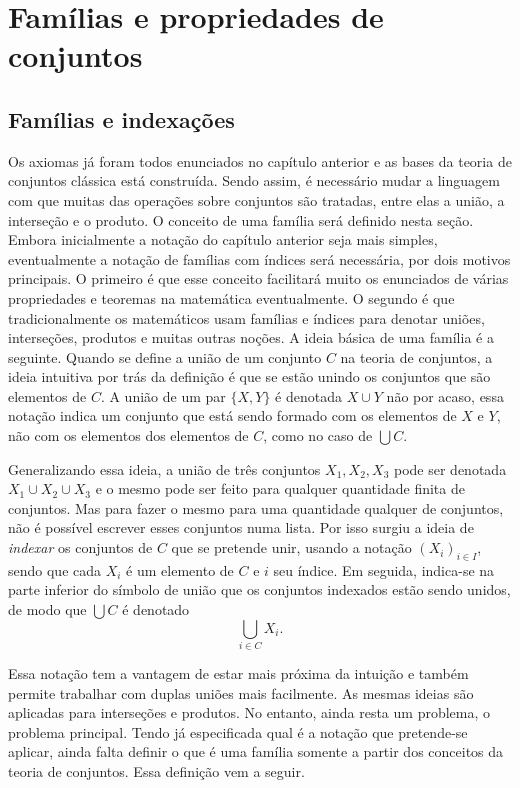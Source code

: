 \chapter{Famílias e propriedades de conjuntos}

\section{Famílias e indexações}

Os axiomas já foram todos enunciados no capítulo anterior e as bases da teoria de conjuntos clássica está construída. Sendo assim, é necessário mudar a linguagem com que muitas das operações sobre conjuntos são tratadas, entre elas a união, a interseção e o produto. O conceito de uma família será definido nesta seção. Embora inicialmente a notação do capítulo anterior seja mais simples, eventualmente a notação de famílias com índices será necessária, por dois motivos principais. O primeiro é que esse conceito facilitará muito os enunciados de várias propriedades e teoremas na matemática eventualmente. O segundo é que tradicionalmente os matemáticos usam famílias e índices para denotar uniões, interseções, produtos e muitas outras noções. A ideia básica de uma família é a seguinte. Quando se define a união de um conjunto $C$ na teoria de conjuntos, a ideia intuitiva por trás da definição é que se estão unindo os conjuntos que são elementos de $C$. A união de um par $\{X,Y\}$ é denotada $X \cup Y$ não por acaso, essa notação indica um conjunto que está sendo formado com os elementos de $X$ e $Y$, não com os elementos dos elementos de $C$, como no caso de $\bigcup C$. 

Generalizando essa ideia, a união de três conjuntos $X_1,X_2,X_3$ pode ser denotada $X_1 \cup X_2 \cup X_3$ e o mesmo pode ser feito para qualquer quantidade finita de conjuntos. Mas para fazer o mesmo para uma quantidade qualquer de conjuntos, não é possível escrever esses conjuntos numa lista. Por isso surgiu a ideia de \emph{indexar} os conjuntos de $C$ que se pretende unir, usando a notação $(X_i)_{i \in I}$, sendo que cada $X_i$ é um elemento de $C$ e $i$ seu índice. Em seguida, indica-se na parte inferior do símbolo de união que os conjuntos indexados estão sendo unidos, de modo que $\bigcup C$ é denotado
	\begin{equation*}
	\bigcup_{i \in C} X_i.
	\end{equation*}

Essa notação tem a vantagem de estar mais próxima da intuição e também permite trabalhar com duplas uniões mais facilmente. As mesmas ideias são aplicadas para interseções e produtos. No entanto, ainda resta um problema, o problema principal. Tendo  já especificada qual é a notação que pretende-se aplicar, ainda falta definir o que é uma família somente a partir dos conceitos da teoria de conjuntos. Essa definição vem a seguir.


